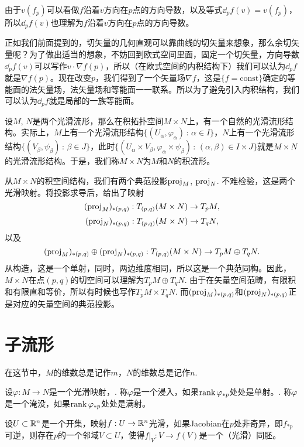 由于$v(f_p)$可以看做$f$沿着$v$方向在$p$点的方向导数，以及等式$\dd_pf(v)=v(f_p)$，所以$\dd_pf(v)$也理解为$f$沿着$v$方向在$p$点的方向导数。

正如我们前面提到的，切矢量的几何直观可以靠曲线的切矢量来想象，那么余切矢量呢？为了做出适当的想象，不妨回到欧式空间里面，固定一个切矢量，方向导数$\dd_pf(v)$可以写作$v\cdot \nabla f(p)$，所以（在欧式空间的内积结构下）我们可以认为$\dd_pf$就是$\nabla f(p)$。现在改变$p$，我们得到了一个矢量场$\nabla f$，这是$\{f=\text{const}\}$确定的等能面的法矢量场，法矢量场和等能面一一联系。所以为了避免引入内积结构，我们可以认为$\dd_pf$就是局部的一族等能面。

\begin{para}[积流形]
设$M$, $N$是两个光滑流形，那么在积拓扑空间$M\times N$上，有一个自然的光滑流形结构。实际上，$M$上有一个光滑流形结构$\{(U_\alpha,\varphi_\alpha)\,:\, \alpha\in I\}$，$N$上有一个光滑流形结构$\{(V_\beta,\psi_\beta)\,:\, \beta\in J\}$，此时$\{(U_\alpha\times V_\beta,\varphi_\alpha\times \psi_\beta)\,:\, (\alpha,\beta)\in I\times J\}$就是$M\times N$的光滑流形结构。于是，我们称$M\times N$为$M$和$N$的积流形。

从$M\times N$的积空间结构，我们有两个典范投影$\operatorname{proj}_M$, $\operatorname{proj}_N$. 不难检验，这是两个光滑映射。将投影求导后，给出了映射
\[
	(\operatorname{proj}_M)_{*(p,q)}:T_{(p,q)}(M\times N)\to T_p M,
\]
\[
	(\operatorname{proj}_N)_{*(p,q)}:T_{(p,q)}(M\times N)\to T_q N,
\]
以及
\[
	(\operatorname{proj}_M)_{*(p,q)}\oplus (\operatorname{proj}_N)_{*(p,q)}:T_{(p,q)}(M\times N)\to T_p M\oplus T_q N.
\]
从构造，这是一个单射，同时，两边维度相同，所以这是一个典范同构。因此，$M\times N$在点$(p,q)$的切空间可以理解为$T_p M\oplus T_q N$. 由于在矢量空间范畴，有限积和有限直和等价，所以有时候也写作$T_p M\times T_q N$. 而$(\operatorname{proj}_M)_{*(p,q)}$和$(\operatorname{proj}_N)_{*(p,q)}$正是对应的矢量空间的典范投影。
\end{para}

\section{子流形}

在这节中，$M$的维数总是记作$m$，$N$的维数总是记作$n$.

\begin{para}
设$\varphi:M\to N$是一个光滑映射，. 称$\varphi$是一个浸入，如果$\operatorname{rank} \varphi_{*p}$处处是单射。. 称$\varphi$是一个淹没，如果$\operatorname{rank} \varphi_{*p}$处处是满射。
\end{para}

\begin{thm}[反函数定理]
设$U\subset \mathbb{R}^n$是一个开集，映射$f:U\to \mathbb{R}^n$光滑，如果Jacobian在$p$处非奇异，即$f_{*p}$可逆，则存在$p$的一个邻域$V\subset U$，使得$f|_V:V\to f(V)$是一个（光滑）同胚。
\end{thm}


